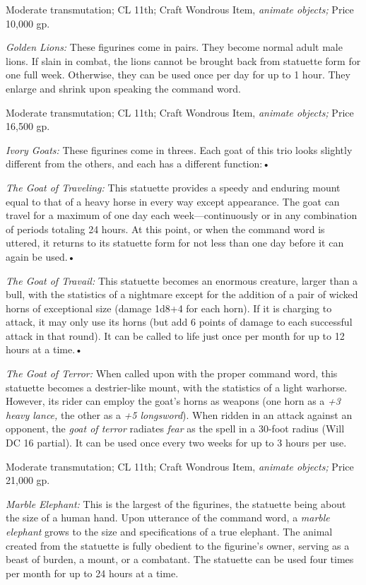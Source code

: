 \documentclass{article}
\begin{document}
Moderate transmutation; CL 11th; Craft Wondrous Item, \textit{animate objects; 
}Price 10,000 gp.

\textit{Golden Lions: }These figurines come in pairs. They become normal adult 
male lions. If slain in combat, the lions cannot be brought back from statuette 
form for one full week. Otherwise, they can be used once per day for up to 1 hour. 
They enlarge and shrink upon speaking the command word.

Moderate transmutation; CL 11th; Craft Wondrous Item, \textit{animate objects; 
}Price 16,500 gp.

\textit{Ivory Goats: }These figurines come in threes. Each goat of this trio looks 
slightly different from the others, and each has a different function:• 

\textit{The Goat of Traveling: }This statuette provides a speedy and enduring mount 
equal to that of a heavy horse in every way except appearance. The goat can travel 
for a maximum of one day each week---continuously or in any combination of periods 
totaling 24 hours. At this point, or when the command word is uttered, it returns 
to its statuette form for not less than one day before it can again be used.• 

\textit{The Goat of Travail: }This statuette becomes an enormous creature, larger 
than a bull, with the statistics of a nightmare except for the addition of a pair 
of wicked horns of exceptional size (damage 1d8+4 for each horn). If it is charging 
to attack, it may only use its horns (but add 6 points of damage to each successful 
attack in that round). It can be called to life just once per month for up to 12 
hours at a time.• 

\textit{The Goat of Terror: }When called upon with the proper command word, this 
statuette becomes a destrier-like mount, with the statistics of a light warhorse. 
However, its rider can employ the goat's horns as weapons (one horn as a \textit{+3 
heavy lance, }the other as a \textit{+5 longsword}). When ridden in an attack against 
an opponent, the \textit{goat of terror }radiates \textit{fear }as the spell in 
a 30-foot radius (Will DC 16 partial). It can be used once every two weeks for 
up to 3 hours per use.

Moderate transmutation; CL 11th; Craft Wondrous Item, \textit{animate objects; 
}Price 21,000 gp.

\textit{Marble Elephant: }This is the largest of the figurines, the statuette being 
about the size of a human hand. Upon utterance of the command word, a \textit{marble 
elephant }grows to the size and specifications of a true elephant. The animal created 
from the statuette is fully obedient to the figurine's owner, serving as a beast 
of burden, a mount, or a combatant. The statuette can be used four times per month 
for up to 24 hours at a time.
\end{document}
